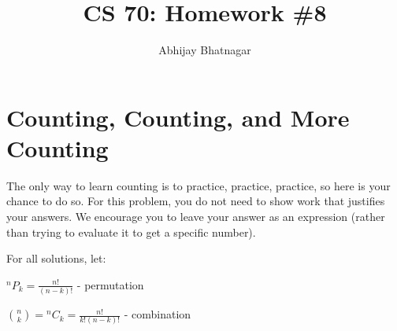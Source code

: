 \documentclass[11pt, notitlepage]{article}
\makeatletter
\newcommand{\Question}[1]{\newpage\section{#1}}
\newcommand*{\Perm}[2]{{}^{#1}\!P_{#2}}%
\newcommand*{\Comb}[2]{{}^{#1}C_{#2}}%
\newcommand*{\toccontents}{\@starttoc{toc}}
\makeatother
\begin{document}
   \title{CS 70: Homework \#8}
   \author{Abhijay Bhatnagar}
   \maketitle
   \toccontents

\Question{Counting, Counting, and More Counting}

The only way to learn counting is to practice, practice, practice, so
here is your chance to do so.
For this problem, you do not need to show work that justifies your answers.
We encourage you to leave your answer as an expression (rather than
trying to evaluate it to get a specific number).

For all solutions, let:

 $\Perm{n}{k}=\frac{n!}{(n-k)!}$ - permutation 

$\binom nk=\Comb{n}{k}=\frac{n!}{k!(n-k)!}$ - combination  
\end{document}
